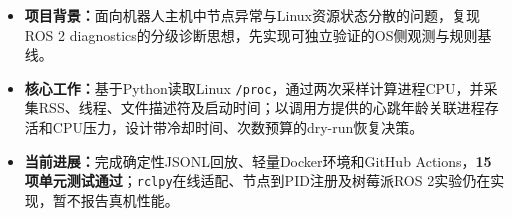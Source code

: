 

\begin{itemize}[parsep=0.5ex]
  \item \textbf{项目背景：}面向机器人主机中节点异常与Linux资源状态分散的问题，复现ROS 2 diagnostics的分级诊断思想，先实现可独立验证的OS侧观测与规则基线。

  \item \textbf{核心工作：}基于Python读取Linux \texttt{/proc}，通过两次采样计算进程CPU，并采集RSS、线程、文件描述符及启动时间；以调用方提供的心跳年龄关联进程存活和CPU压力，设计带冷却时间、次数预算的dry-run恢复决策。

  \item \textbf{当前进展：}完成确定性JSONL回放、轻量Docker环境和GitHub Actions，\textbf{15项单元测试通过}；\texttt{rclpy}在线适配、节点到PID注册及树莓派ROS 2实验仍在实现，暂不报告真机性能。
\end{itemize}
